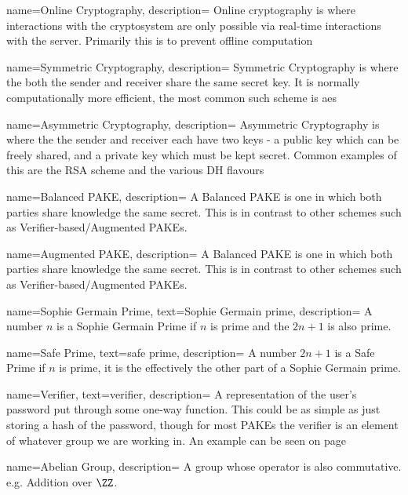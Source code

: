 \glsnoexpandfields

 {
  name={Online Cryptography},
  description={
    Online cryptography is where interactions with the cryptosystem are only possible
    via real-time interactions with the server. Primarily this is to prevent offline computation%
  }
}

 {
  name={Symmetric Cryptography},
  description={
    Symmetric Cryptography is where the both the sender and receiver share the same secret key. It is normally computationally more efficient, the most common such scheme is \gls{aes}%
  }
}

 {
  name={Asymmetric Cryptography},
  description={
    Asymmetric Cryptography is where the the sender and receiver each have two keys - a public key which can be freely shared, and a private key which must be kept secret. Common examples of this are the RSA scheme and the various DH flavours%
  }
}

 {
  name={Balanced PAKE},
  description={
    A Balanced PAKE is one in which both parties share knowledge the same secret.
    This is in contrast to other schemes such as Verifier-based/Augmented PAKEs.
  }
}

 {
  name={Augmented PAKE},
  description={
    A Balanced PAKE is one in which both parties share knowledge the same secret.
    This is in contrast to other schemes such as Verifier-based/Augmented PAKEs.
  }
}

 {
  name={Sophie Germain Prime},
  text={Sophie Germain prime},
  description={
    A number $n$ is a Sophie Germain Prime if $n$ is prime and the $2n+1$ is also prime.
  }
}

 {
  name={Safe Prime},
  text={safe prime},
  description={
    A number $2n+1$ is a Safe Prime if $n$ is prime, it is the effectively the other part of a Sophie Germain prime.
  }
}

 {
  name={Verifier},
  text={verifier},
  description={
    A representation of the user's password put through some one-way function.
    This could be as simple as just storing a hash of the password, though for most PAKEs the verifier is an element of whatever group we are working in.
    An example can be seen on page \pageref{text:srp-verifier-generation}%
  }
}

 {
  name={Abelian Group},
  description={
    A group whose operator is also commutative. e.g. Addition over $\ZZ$.\
  }
}

